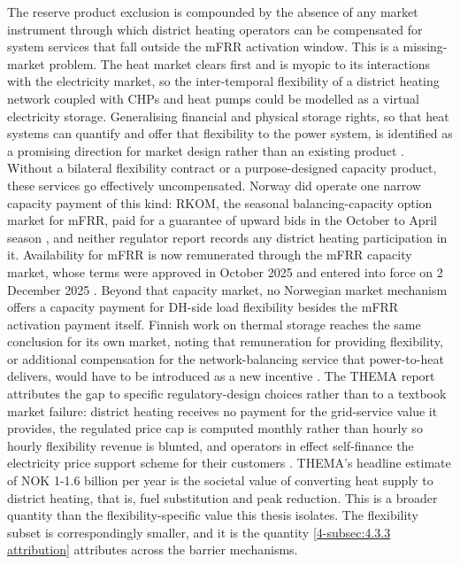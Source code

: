 The reserve product exclusion is compounded by the absence of any market instrument through which district heating operators can be compensated for system services that fall outside the mFRR activation window. This is a missing-market problem. The heat market clears first and is myopic to its interactions with the electricity market, so the inter-temporal flexibility of a district heating network coupled with CHPs and heat pumps could be modelled as a virtual electricity storage. Generalising financial and physical storage rights, so that heat systems can quantify and offer that flexibility to the power system, is identified as a promising direction for market design rather than an existing product \cite{mitridati_heat_2020}. Without a bilateral flexibility contract or a purpose-designed capacity product, these services go effectively uncompensated. Norway did operate one narrow capacity payment of this kind: RKOM, the seasonal balancing-capacity option market for mFRR, paid for a guarantee of upward bids in the October to April season \cite{ove_flataker_national_2020, langset_national_2021}, and neither regulator report records any district heating participation in it. Availability for mFRR is now remunerated through the mFRR capacity market, whose terms were approved in October 2025 and entered into force on 2 December 2025 \cite{statnett_forslag_2025}. Beyond that capacity market, no Norwegian market mechanism offers a capacity payment for DH-side load flexibility besides the mFRR activation payment itself. Finnish work on thermal storage reaches the same conclusion for its own market, noting that remuneration for providing flexibility, or additional compensation for the network-balancing service that power-to-heat delivers, would have to be introduced as a new incentive \cite{jaanto_thermal_2023}. The THEMA report attributes the gap to specific regulatory-design choices rather than to a textbook market failure: district heating receives no payment for the grid-service value it provides, the regulated price cap is computed monthly rather than hourly so hourly flexibility revenue is blunted, and operators in effect self-finance the electricity price support scheme for their customers \cite{Thema_fjernvarme_2024}. THEMA's headline estimate of NOK 1-1.6 billion per year is the societal value of converting heat supply to district heating, that is, fuel substitution and peak reduction. This is a broader quantity than the flexibility-specific value this thesis isolates. The flexibility subset is correspondingly smaller, and it is the quantity \autoref{4-subsec:4.3.3 attribution} attributes across the barrier mechanisms.

